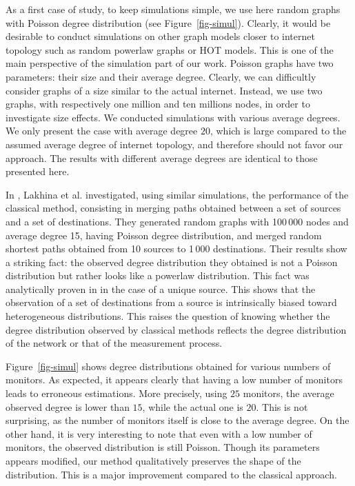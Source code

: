 \documentclass[conference]{IEEEtran}
\begin{document}
As a first case of study, to keep simulations simple, we use here random graphs with Poisson degree distribution (see Figure~\ref{fig-simul}). Clearly, it would be desirable to conduct simulations on other graph models closer to internet topology such as random powerlaw graphs or HOT models. This is one of the main perspective of the simulation part of our work. Poisson graphs have two parameters: their size and their average degree. Clearly, we can difficultly consider graphs of a size similar to the actual internet. Instead, we use two graphs, with respectively one million and ten millions nodes, in order to investigate size effects. We conducted simulations with various average degrees. We only present the case with average degree $20$, which is large compared to the assumed average degree of internet topology, and therefore should not favor our approach. The results with different average degrees are identical to those presented here.

In \cite{DBLP:conf/infocom/LakhinaBCX03}, Lakhina et al. investigated, using
similar simulations, the performance of the classical method, consisting in
merging paths obtained between a set of sources and a set of destinations. They
generated random graphs with 100\,000 nodes and average degree 15, having
Poisson degree distribution, and merged random shortest paths obtained from 10
sources to 1\,000 destinations. Their results show a striking fact: the observed
degree distribution they obtained is not a Poisson distribution but rather looks
like a powerlaw distribution. This fact was analytically proven in
\cite{DBLP:journals/jacm/AchlioptasCKM09} in the case of a unique source. This
shows that the observation of a set of destinations from a source is
intrinsically biased toward heterogeneous distributions. This raises the
question of knowing whether the degree distribution observed by classical
methods reflects the degree distribution of the network or that of the
measurement process.

Figure~\ref{fig-simul} shows degree distributions obtained for various numbers of monitors. As expected, it appears clearly that having a low number of monitors leads to erroneous estimations. More precisely, using $25$ monitors, the average observed degree is lower than $15$, while the actual one is $20$. This is not surprising, as the number of monitors itself is close to the average degree. On the other hand, it is very interesting to note that even with a low number of monitors, the observed distribution is still Poisson. Though its parameters appears modified, our method qualitatively preserves the shape of the distribution. This is a major improvement compared to the classical approach.
\end{document}
